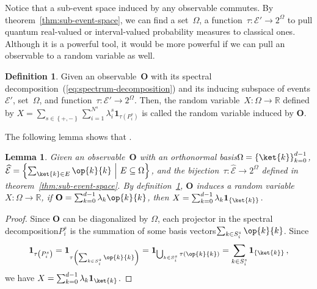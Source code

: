 \documentclass[12pt]{iopart}
\theoremstyle{plain}
\newtheorem{lemma}[thm]{Lemma}
\theoremstyle{definition}
\newtheorem{definition}[thm]{Definition}
\theoremstyle{remark}
\newcommand{\events}{\ensuremath{\mathcal{E}}}
\newcommand{\proj}[1]{\op{#1}{#1}}
\newcommand{\set}[2]{\ensuremath{\left\{ {#1}~\middle|~{#2}\right\} }}
\newcommand{\nb}{\nolinebreak[3] }
\begin{document}
Notice that a sub-event space induced by any observable commutes.
By theorem~\ref{thm:sub-event-space}, we can find a set~$\Omega$,
a function~$\tau:\events'\rightarrow2^{\Omega}$ to pull quantum
real-valued or interval-valued probability measures to classical ones.
Although it is a powerful tool, it would be more powerful if we can
pull an observable to a random variable as well.

\begin{definition}\label{def:observable2random-variable}Given an
observable~$\mathbf{O}$ with its spectral decomposition~(\ref{eq:spectrum-decomposition})
and its inducing subspace of events\nb$\events'$, set~$\Omega$,
and function~$\tau:\events'\rightarrow2^{\Omega}$. Then, the random
variable~$X:\Omega\rightarrow\mathbb{R}$ defined by $X=\sum_{s\in\left\{ +,-\right\} }\sum_{i=1}^{N^{s}}\lambda_{i}^{s}\mathbf{1}_{\tau\left(P_{i}^{s}\right)}$
is called the random variable induced by $\mathbf{O}$.\end{definition}

The following lemma shows that .

\begin{lemma}\label{lemma:observable2random-variable}Given an observable~$\mathbf{O}$
with an orthonormal basis\nb$\Omega=\left\{ \ket{k}\right\} _{k=0}^{d-1}$,
$\widehat{\events}=\set{\sum_{\ket{k}\in E}\proj{k}}{E\subseteq\Omega}$,
and the bijection~$\tau:\widehat{\events}\rightarrow2^{\Omega}$
defined in theorem~\ref{thm:sub-event-space}. By definition~\ref{def:observable2random-variable},
$\mathbf{O}$ induces a random variable\nb$X:\Omega\rightarrow\mathbb{R}$,
if $\mathbf{O}=\sum_{k=0}^{d-1}\lambda_{k}\proj{k}$, then $X=\sum_{k=0}^{d-1}\lambda_{k}\mathbf{1}_{\left\{ \ket{k}\right\} }$.\end{lemma}

\begin{proof}Since $\mathbf{O}$ can be diagonalized by $\Omega$,
each projector in the spectral decomposition\nb$P_{i}^{s}$ is the
summation of some basis vectors\nb$\sum_{k\in S_{i}^{s}}\proj{k}$.
Since
\begin{equation}
\mathbf{1}_{\tau\left(P_{i}^{s}\right)}=\mathbf{1}_{\tau\left(\sum_{k\in S_{i}^{s}}\proj{k}\right)}=\mathbf{1}_{\bigcup_{k\in S_{i}^{s}}\tau\left(\proj{k}\right)}=\sum_{k\in S_{i}^{s}}\mathbf{1}_{\left\{ \ket{k}\right\} }\,,
\end{equation}
we have $X=\sum_{k=0}^{d-1}\lambda_{k}\mathbf{1}_{\ket{k}}$.\end{proof}
\end{document}
